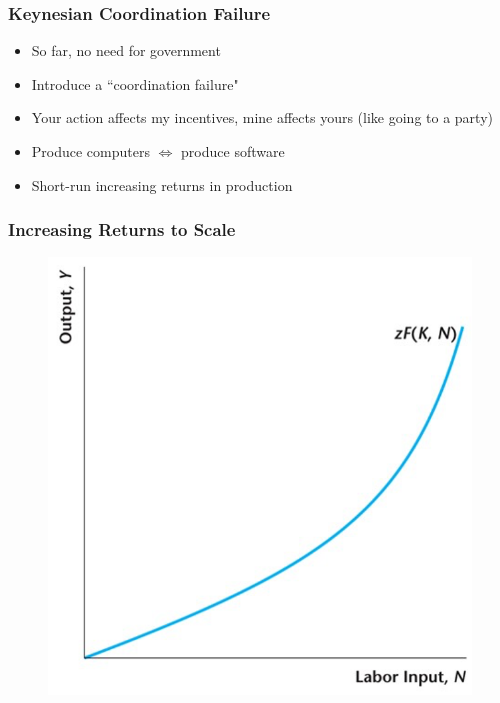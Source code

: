 \documentclass{beamer}
\begin{document}
\begin{frame}
\frametitle[alignment=center]{Keynesian Coordination Failure}
\begin{itemize}
\item So far, no need for government
\bigskip
\item Introduce a ``coordination failure"
\bigskip
\item Your action affects my incentives, mine affects yours (like going to a party)
\bigskip
\item Produce computers $\iff$ produce software
\bigskip
\item Short-run increasing returns in production
\end{itemize}
\end{frame}

\begin{frame}
\frametitle[alignment=center]{Increasing Returns to Scale}
\begin{figure}
\centering
\includegraphics[scale=0.65]{Figures/W_Fig_13pt5.png}
\end{figure}
\end{frame}
\end{document}
